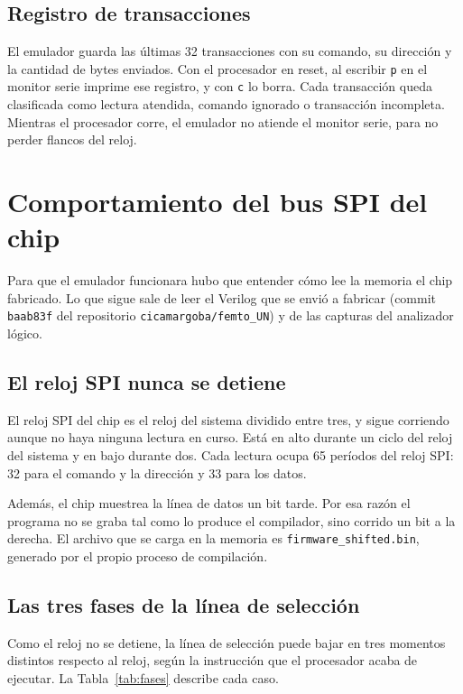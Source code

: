 \documentclass[11pt,letterpaper,oneside]{report}
\newcommand{\code}[1]{\texttt{#1}}
\begin{document}
\subsection{Registro de transacciones}

El emulador guarda las últimas 32 transacciones con su comando, su dirección y la cantidad de bytes enviados. Con el procesador en reset, al escribir \code{p} en el monitor serie imprime ese registro, y con \code{c} lo borra. Cada transacción queda clasificada como lectura atendida, comando ignorado o transacción incompleta. Mientras el procesador corre, el emulador no atiende el monitor serie, para no perder flancos del reloj.

\section{Comportamiento del bus SPI del chip}

Para que el emulador funcionara hubo que entender cómo lee la memoria el chip fabricado. Lo que sigue sale de leer el Verilog que se envió a fabricar (commit \code{baab83f} del repositorio \code{cicamargoba/femto\_UN}) y de las capturas del analizador lógico.

\subsection{El reloj SPI nunca se detiene}

El reloj SPI del chip es el reloj del sistema dividido entre tres, y sigue corriendo aunque no haya ninguna lectura en curso. Está en alto durante un ciclo del reloj del sistema y en bajo durante dos. Cada lectura ocupa 65 períodos del reloj SPI: 32 para el comando y la dirección y 33 para los datos.

Además, el chip muestrea la línea de datos un bit tarde. Por esa razón el programa no se graba tal como lo produce el compilador, sino corrido un bit a la derecha. El archivo que se carga en la memoria es \code{firmware\_shifted.bin}, generado por el propio proceso de compilación.

\subsection{Las tres fases de la línea de selección}

Como el reloj no se detiene, la línea de selección puede bajar en tres momentos distintos respecto al reloj, según la instrucción que el procesador acaba de ejecutar. La Tabla~\ref{tab:fases} describe cada caso.
\end{document}
